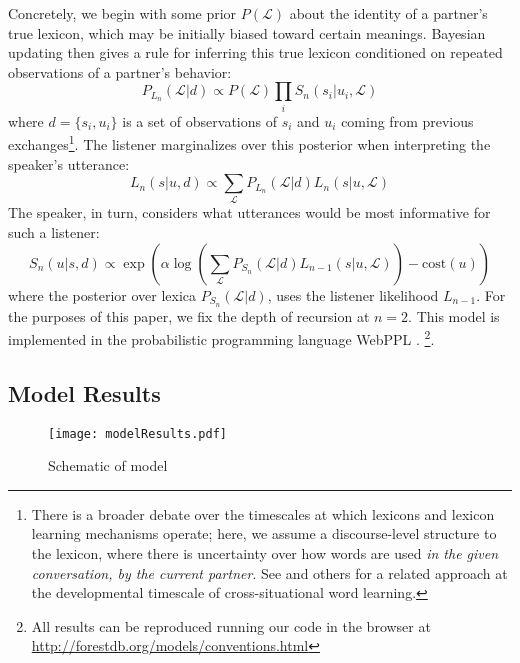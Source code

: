 Concretely, we begin with some prior $P(\mathcal{L})$ about the identity of a partner's true lexicon, which may be initially biased toward certain meanings. 
Bayesian updating then gives a rule for inferring this true lexicon conditioned on repeated observations of a partner's behavior:
$$P_{L_n}(\mathcal{L} | d) \propto P(\mathcal{L})\prod_i S_n(s_i|u_i, \mathcal{L})$$
where $d = \{s_i, u_i\}$ is a set of observations of $s_i$ and $u_i$ coming from previous exchanges\footnote{There is a broader debate over the timescales at which lexicons and lexicon learning mechanisms operate; here, we assume a discourse-level structure to the lexicon, where there is uncertainty over how words are used \emph{in the given conversation, by the current partner}. See \cite{FrankGoodmanTenenbaum09_Wurwur} and others for a related approach at the developmental timescale of cross-situational word learning.}. 
The listener marginalizes over this posterior when interpreting the speaker's utterance:
$$L_n(s | u, d) \propto \sum_\mathcal{L}P_{L_n}(\mathcal{L}|d)L_n(s|u,\mathcal{L})$$
The speaker, in turn, considers what utterances would be most informative for such a listener:
$$S_n(u | s, d) \propto \exp( \alpha\log\left(\sum_{\mathcal{L}} P_{S_n}(\mathcal{L} | d) L_{n-1}(s | u, \mathcal{L})\right) - \textrm{cost}(u) )$$
where the posterior over lexica $P_{S_n}(\mathcal{L} | d)$, uses the listener likelihood $L_{n-1}$. For the purposes of this paper, we fix the depth of recursion at $n = 2$.
This model is implemented in the probabilistic programming language WebPPL \cite{GoodmanStuhlmuller14_DIPPL}. \footnote{All results can be reproduced running our code in the browser at \url{http://forestdb.org/models/conventions.html}}. 

\subsection{Model Results}

\begin{figure}
\centering
    \texttt{[image: modelResults.pdf]}
  \caption{Schematic of model}
  \label{fig:modelResults}
\end{figure}

